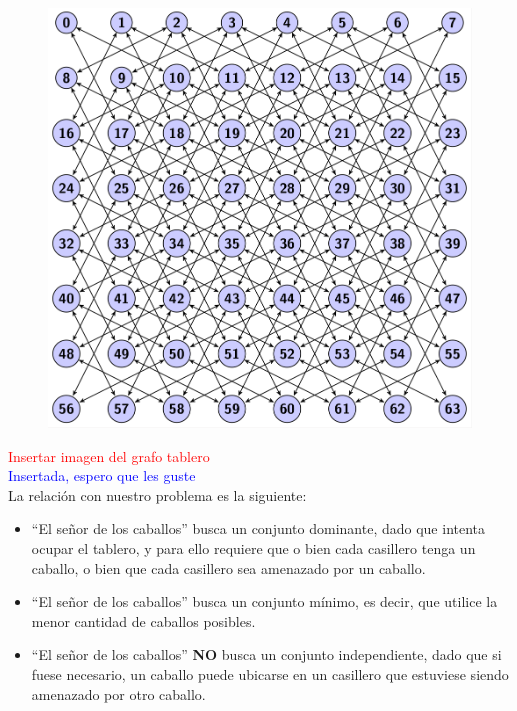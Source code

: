   \begin{figure}[h!]
   \begin{center}
 	\includegraphics[scale=0.4]{imagenes/tablero8x8.png}
	\label{GrafoCompleto}
   \end{center}
 \end{figure}

\textcolor{red}{Insertar imagen del grafo tablero}\\
\textcolor{blue}{Insertada, espero que les guste}\\

La relación con nuestro problema es la siguiente:
\begin{itemize}
	\item ``El se\~nor de los caballos'' busca un conjunto dominante, dado que intenta ocupar el tablero, y para ello requiere que o bien cada casillero tenga un caballo, o bien que cada casillero sea amenazado por un caballo.
	\item ``El se\~nor de los caballos'' busca un conjunto m\'inimo, es decir, que utilice la menor cantidad de caballos posibles.
	\item ``El se\~nor de los caballos'' \textbf{NO} busca un conjunto independiente, dado que si fuese necesario, un caballo puede ubicarse en un casillero que estuviese siendo amenazado por otro caballo.
	
\end{itemize}
